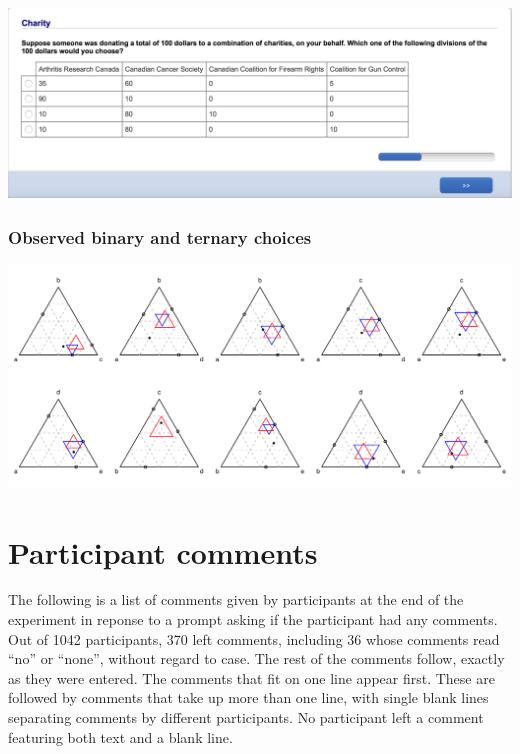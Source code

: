 \documentclass[11pt,letter]{article}
\begin{document}
\includegraphics[width=15cm]{Population_study_design/screenshot_charity.png}

\subsubsection*{Observed binary and ternary choices}

\includegraphics[width=15cm]{./Population_study_data/Simplexes/charity.pdf}

\pagebreak

\section{Participant comments}

The following is a list of comments given by participants at the end of the experiment in reponse to a prompt asking if the participant had any comments.
Out of 1042 participants, 370 left comments, including 36 whose comments read ``no'' or ``none'', without regard to case.
The rest of the comments follow, exactly as they were entered.
The comments that fit on one line appear first.
These are followed by comments that take up more than one line, with single blank lines separating comments by different participants.
No participant left a comment featuring both text and a blank line.

\begin{small}



\end{small}




\end{document}
